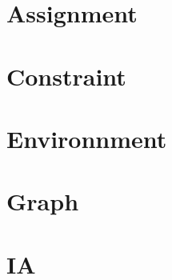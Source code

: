 
\section{Assignment}


\section{Constraint}



\section{Environnment}


\section{Graph}


\section{IA}




